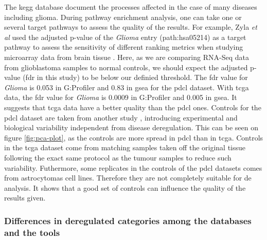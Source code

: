 The \acrshort{kegg} database document the processes affected in the case of many diseases including glioma.
During pathway enrichment analysis, one can take one or several target pathways to assess the quality of the results.
For example, Zyla \textit{et al} used the adjusted p-value of the \textit{Glioma} entry (path:hsa05214) as a target pathway to assess the sensitivity of different ranking metrics when studying microarray data from brain tissue \cite*{Zyla2017}.
Here, as we are comparing RNA-Seq data from glioblastoma samples to normal controls, we should expect the adjusted p-value (\acrshort{fdr} in this study) to be below our definied threshold.
The \acrshort{fdr} value for \textit{Glioma} is 0.053 in G:Profiler and 0.83 in \acrshort{gsea} for the \acrshort{pdcl} dataset.
With \acrshort{tcga} data, the \acrshort{fdr} value for \textit{Glioma} is 0.0009 in G:Profiler and 0.005 in \acrshort{gsea}.
It suggests that \acrshort{tcga} data have a better quality than the \acrshort{pdcl} ones.
Controls for the \acrshort{pdcl} dataset are taken from another study \cite*{Lundin2018}, introducing experimental and biological variability independent from disease deregulation.
This can be seen on figure \ref*{fig:pca-plot}, as the controls are more spread in \acrshort{pdcl} than in \acrshort{tcga}.
Controls in the \acrshort{tcga} dataset come from matching samples taken off the original tissue following the exact same protocol as the tumour samples to reduce such variability.
Futhermore, some replicates in the controls of the \acrshort{pdcl} datasets comes from astrocytomas cell lines.
Therefore they are not completely suitable for \acrlong{de} analysis.
It shows that a good set of controls can influence the quality of the results given.

\subsubsection{Differences in deregulated categories among the databases and the tools}

